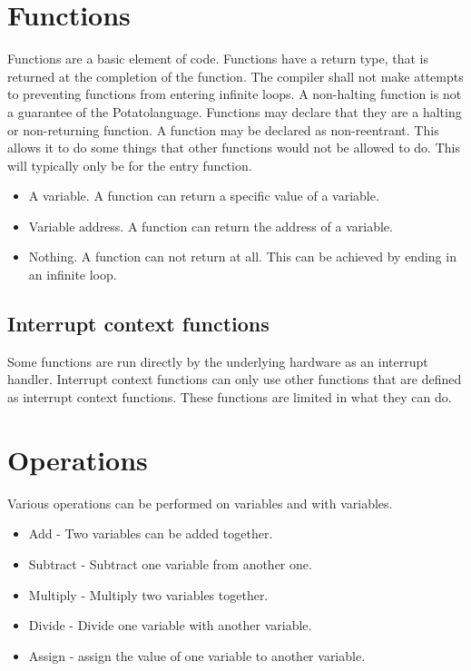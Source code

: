 \documentclass[12pt]{article}
\newcommand{\progLangNameSpace}{Potato\space }
\begin{document}
\section{ Functions}

Functions are a basic element of code. Functions have a return type, that is returned at the completion of the function. 
The compiler shall not make attempts to preventing functions from entering infinite loops. 
A non-halting function is not a guarantee of the \progLangNameSpace language. 
Functions may declare that they are a halting or non-returning function.
A function may be declared as non-reentrant. This allows it to do some things that other functions would not be allowed to do.
This will typically only be for the entry function.

\begin{itemize}
\item A variable. A function can return a specific value of a variable.
\item Variable address. A function can return the address of a variable.
\item Nothing. A function can not return at all. This can be achieved by ending in an infinite loop.
\end{itemize}

\subsection {Interrupt context functions}

Some functions are run directly by the underlying hardware as an interrupt handler. Interrupt context functions can only use other functions that are defined as interrupt context functions. These functions are limited in what they can do.


\section { Operations }
Various operations can be performed on variables and with variables.
\begin{itemize}
\item Add - Two variables can be added together.
\item Subtract - Subtract one variable from another one.
\item Multiply - Multiply two variables together.
\item Divide - Divide one variable with another variable.
\item Assign - assign the value of one variable to another variable.
\end{itemize}
\end{document}
